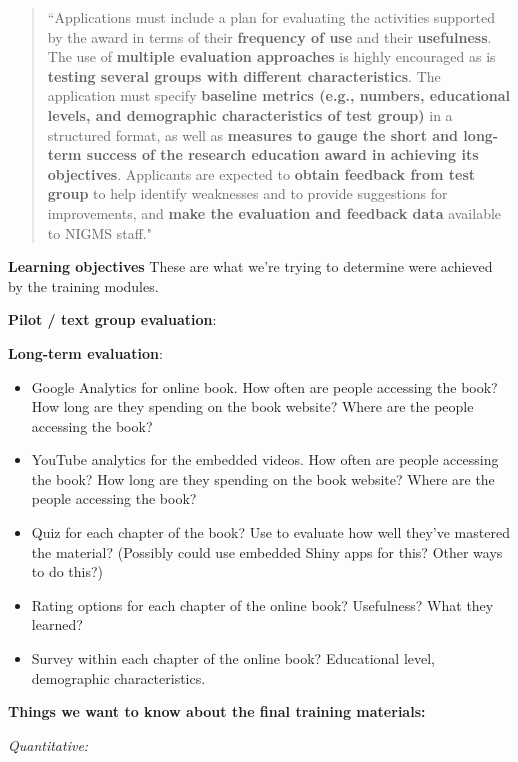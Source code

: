 \documentclass[pdftex,english,11pt,parskip=half]{scrartcl}
\begin{document}
\begin{quotation}
``Applications must include a plan for evaluating the activities supported by the award in terms of their \textbf{frequency of use} and their \textbf{usefulness}. The use of \textbf{multiple evaluation approaches} is highly encouraged as is \textbf{testing several groups with different characteristics}. The application must specify \textbf{baseline metrics (e.g., numbers, educational levels, and demographic characteristics of test group)} in a structured format, as well as \textbf{measures to gauge the short and long-term success of the research education award in achieving its objectives}. Applicants are expected to \textbf{obtain feedback from test group} to help identify weaknesses and to provide suggestions for improvements, and \textbf{make the evaluation and feedback data} available to NIGMS staff."
\end{quotation}



\textbf{Learning objectives} These are what we're trying to determine were achieved by the training modules.

\textbf{Pilot / text group evaluation}:

\textbf{Long-term evaluation}:

\begin{itemize}
\item Google Analytics for online book. How often are people accessing the book? How long are they spending on the book website? Where are the people accessing the book?
\item YouTube analytics for the embedded videos. How often are people accessing the book? How long are they spending on the book website? Where are the people accessing the book?
\item Quiz for each chapter of the book? Use to evaluate how well they've mastered the material? (Possibly could use embedded Shiny apps for this? Other ways to do this?)
\item Rating options for each chapter of the online book? Usefulness? What they learned?
\item Survey within each chapter of the online book? Educational level, demographic characteristics.
\end{itemize}

\textbf{Things we want to know about the final training materials:}

\textit{Quantitative:}
\end{document}
